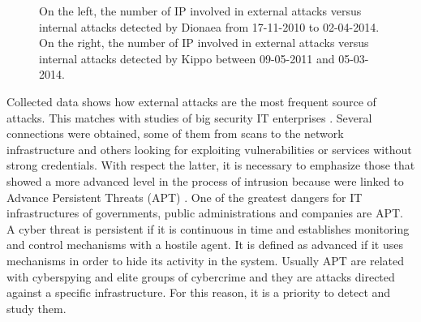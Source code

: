 \documentclass[a4paper]{llncs}
\begin{document}
\begin{figure}[h]
	\label{fig:intvsextDionaea}
	\label{fig:intvsextKippo}
	\caption{On the left, the number of IP involved in external attacks versus internal attacks detected by Dionaea from 17-11-2010 to 02-04-2014. On the right, the number of IP involved in external attacks versus internal attacks detected by Kippo between 09-05-2011 and 05-03-2014.}
\end{figure}

Collected data shows how external attacks are the most frequent source of attacks. This matches with studies of big security IT enterprises \cite{verizon-2015}. Several connections were obtained, some of them from scans to the network infrastructure and others looking for exploiting vulnerabilities or services without strong credentials. With respect the latter, it is necessary to emphasize those that showed a more advanced level in the process of intrusion because were linked to Advance Persistent Threats (APT) \cite{Sood&Enbody2013}. One of the greatest dangers for IT infrastructures of governments, public administrations and companies are APT. A cyber threat is persistent if it is continuous in time and establishes monitoring and control mechanisms with a hostile agent. It is defined as advanced if it uses mechanisms in order to hide its activity in the system. Usually APT are related with cyberspying and elite groups of cybercrime and they are attacks directed against a specific infrastructure. For this reason, it is a priority to detect and study them.
\end{document}
